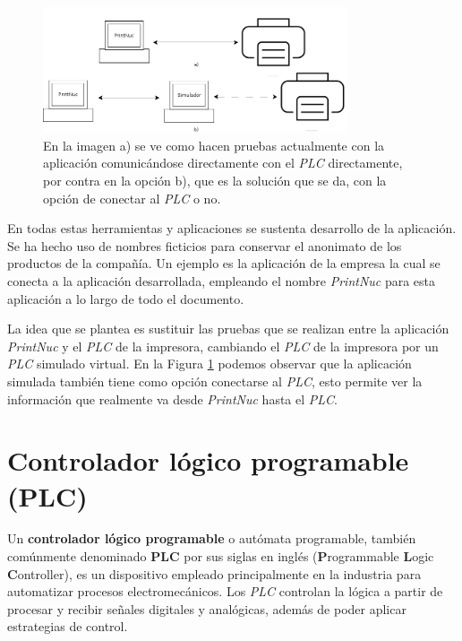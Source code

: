 \documentclass[pdftex,11pt,a4paper]{book}
\begin{document}
\begin{figure}[h]
\begin{center}
\includegraphics[width=0.8\textwidth]{img/diagrama_plc}
\caption{\label{plc_diagrama}En la imagen a) se ve como hacen pruebas actualmente con la aplicación comunicándose directamente con el \emph{PLC} directamente, por contra en la opción b), que es la solución que se da, con la opción de conectar al \emph{PLC} o no.}
\end{center}
\end{figure}

En todas estas herramientas y aplicaciones se sustenta desarrollo de la aplicación. Se ha hecho uso de nombres ficticios para conservar el anonimato de los productos de la compañía. Un ejemplo es la aplicación de la empresa la cual se conecta a la aplicación desarrollada, empleando el nombre \emph{PrintNuc} para esta aplicación a lo largo de todo el documento.

La idea que se plantea es sustituir las pruebas que se realizan entre la aplicación \emph{PrintNuc} y el \emph{PLC} de la impresora, cambiando el \emph{PLC} de la impresora por un \emph{PLC} simulado virtual. En la Figura \ref{plc_diagrama} podemos observar que la aplicación simulada también tiene como opción conectarse al \emph{PLC}, esto permite ver la información que realmente va desde \emph{PrintNuc} hasta el \emph{PLC}.

\section{Controlador lógico programable (PLC)}


Un \textbf{controlador lógico programable} o autómata programable\cite{plc_wiki}, también comúnmente denominado \textbf{PLC} por sus siglas en inglés (\textbf{P}rogrammable \textbf{L}ogic \textbf{C}ontroller), es un dispositivo empleado principalmente en la industria para automatizar procesos electromecánicos.
Los \emph{PLC} controlan la lógica a partir de procesar y recibir señales digitales y analógicas, además de poder aplicar estrategias de control.
\end{document}
